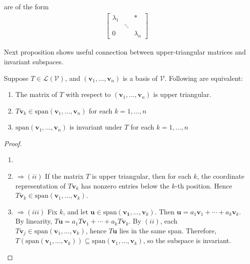 \begin{definition}  are of the form
\begin{align}
\begin{bmatrix}
\lambda_1 & & * \\
& \ddots & \\
0 & & \lambda_n
\end{bmatrix} \nonumber
\end{align}
\end{definition}

Next proposition shows useful connection between upper-triangular matrices and invariant subspaces.

\begin{proposition} \label{prop:invariantsubspaceequivalence} Suppose $T \in \mathcal{L}(\mathcal{V})$, and $(\mathbf{v}_1, \ldots, \mathbf{v}_n)$ is a basis of $\mathcal{V}$. Following are equivalent:
\begin{enumerate}[label=\roman*.]
\setlength{\itemsep}{0pt}
\item The matrix of $T$ with respect to $(\mathbf{v}_1, \ldots, \mathbf{v}_n)$ is upper triangular.
\item $T \mathbf{v}_k \in \text{span}(\mathbf{v}_1, \ldots, \mathbf{v}_n)$ for each $k = 1, \ldots, n$
\item $\text{span}(\mathbf{v}_1, \ldots, \mathbf{v}_n)$ is invariant under $T$ for each $k=1, \ldots, n$
\end{enumerate}
\begin{proof}
\begin{enumerate}[label=\roman*.]
\setlength{\itemsep}{0pt}
\item[]
\item[$(i)$]$\Rightarrow (ii)$ If the matrix $T$ is upper triangular, then for each $k$, the coordinate representation of $T \mathbf{v}_k$ has nonzero entries below the $k$-th position. Hence $T \mathbf{v}_k \in \text{span}(\mathbf{v}_1, \ldots, \mathbf{v}_k)$.
\item[$(ii)$]$\Rightarrow (iii)$ Fix $k$, and let $\mathbf{u} \in \text{span}(\mathbf{v_1}, \ldots, \mathbf{v}_k)$. Then $\mathbf{u} = a_1 \mathbf{v}_1 + \cdots + a_k \mathbf{v}_k$.\\
By linearity, $T\mathbf{u} = a_1 T \mathbf{v}_1 + \cdots + a_k T \mathbf{v}_k$. By $(ii)$, each $T\mathbf{v}_j \in \text{span}(\mathbf{v}_1, \ldots, \mathbf{v}_k)$, hence $T \mathbf{u}$ lies in the same span. Therefore, $T(\text{span}(\mathbf{v}_1, \ldots, \mathbf{v}_k)) \subseteq \text{span}(\mathbf{v}_1, \ldots, \mathbf{v}_k)$, so the subspace is invariant.

\end{enumerate}
\end{proof}
\end{proposition}

